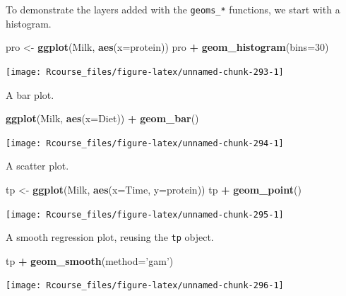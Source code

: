 \documentclass[]{book}
\newenvironment{Shaded}{\begin{snugshade}}{\end{snugshade}}
\newcommand{\DataTypeTok}[1]{\textcolor[rgb]{0.13,0.29,0.53}{#1}}
\newcommand{\DecValTok}[1]{\textcolor[rgb]{0.00,0.00,0.81}{#1}}
\newcommand{\KeywordTok}[1]{\textcolor[rgb]{0.13,0.29,0.53}{\textbf{#1}}}
\newcommand{\NormalTok}[1]{#1}
\newcommand{\OperatorTok}[1]{\textcolor[rgb]{0.81,0.36,0.00}{\textbf{#1}}}
\newcommand{\StringTok}[1]{\textcolor[rgb]{0.31,0.60,0.02}{#1}}
\theoremstyle{definition}
\theoremstyle{definition}
\theoremstyle{definition}
\theoremstyle{remark}
\begin{document}
To demonstrate the layers added with the \texttt{geoms\_*} functions, we start with a histogram.

\begin{Shaded}
\begin{Highlighting}[]
\NormalTok{pro <-}\StringTok{ }\KeywordTok{ggplot}\NormalTok{(Milk, }\KeywordTok{aes}\NormalTok{(}\DataTypeTok{x=}\NormalTok{protein))}
\NormalTok{pro }\OperatorTok{+}\StringTok{ }\KeywordTok{geom_histogram}\NormalTok{(}\DataTypeTok{bins=}\DecValTok{30}\NormalTok{)}
\end{Highlighting}
\end{Shaded}

\texttt{[image: Rcourse\_files/figure-latex/unnamed-chunk-293-1]}

A bar plot.

\begin{Shaded}
\begin{Highlighting}[]
\KeywordTok{ggplot}\NormalTok{(Milk, }\KeywordTok{aes}\NormalTok{(}\DataTypeTok{x=}\NormalTok{Diet)) }\OperatorTok{+}
\StringTok{  }\KeywordTok{geom_bar}\NormalTok{()}
\end{Highlighting}
\end{Shaded}

\texttt{[image: Rcourse\_files/figure-latex/unnamed-chunk-294-1]}

A scatter plot.

\begin{Shaded}
\begin{Highlighting}[]
\NormalTok{tp <-}\StringTok{ }\KeywordTok{ggplot}\NormalTok{(Milk, }\KeywordTok{aes}\NormalTok{(}\DataTypeTok{x=}\NormalTok{Time, }\DataTypeTok{y=}\NormalTok{protein))}
\NormalTok{tp }\OperatorTok{+}\StringTok{ }\KeywordTok{geom_point}\NormalTok{()}
\end{Highlighting}
\end{Shaded}

\texttt{[image: Rcourse\_files/figure-latex/unnamed-chunk-295-1]}

A smooth regression plot, reusing the \texttt{tp} object.

\begin{Shaded}
\begin{Highlighting}[]
\NormalTok{tp }\OperatorTok{+}\StringTok{ }\KeywordTok{geom_smooth}\NormalTok{(}\DataTypeTok{method=}\StringTok{'gam'}\NormalTok{)}
\end{Highlighting}
\end{Shaded}

\texttt{[image: Rcourse\_files/figure-latex/unnamed-chunk-296-1]}
\end{document}
